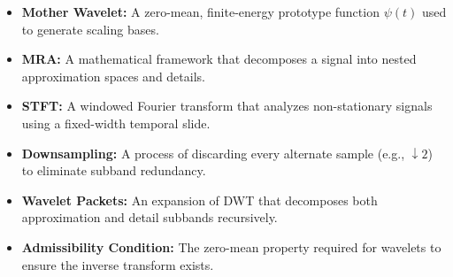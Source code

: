\documentclass[12pt,a4paper]{article}
\begin{document}
\begin{tcolorbox}[defbox, title={\textbf{One-Line Definitions}}]
\begin{itemize}[leftmargin=*, itemsep=2.5pt, topsep=0pt]
  \item \textbf{Mother Wavelet:} A zero-mean, finite-energy prototype function $\psi(t)$ used to generate scaling bases.
  \item \textbf{MRA:} A mathematical framework that decomposes a signal into nested approximation spaces and details.
  \item \textbf{STFT:} A windowed Fourier transform that analyzes non-stationary signals using a fixed-width temporal slide.
  \item \textbf{Downsampling:} A process of discarding every alternate sample (e.g., $\downarrow 2$) to eliminate subband redundancy.
  \item \textbf{Wavelet Packets:} An expansion of DWT that decomposes both approximation and detail subbands recursively.
  \item \textbf{Admissibility Condition:} The zero-mean property required for wavelets to ensure the inverse transform exists.
\end{itemize}
\end{tcolorbox}
\end{document}
